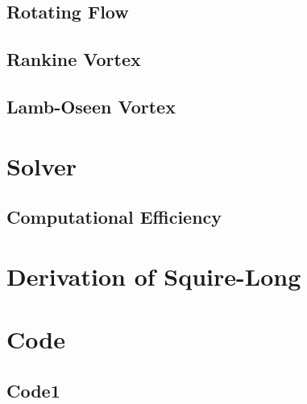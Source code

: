 \documentclass{X:/Documents/Coding/Latex/myreport}
\theoremstyle{plain}
\theoremstyle{definition}
\theoremstyle{remark}
\numberwithin{equation}{section}
\numberwithin{figure}{section}
\begin{document}
\section{Rotating Flow}
\section{Rankine Vortex}
\section{Lamb-Oseen Vortex}

\chapter{Solver}

\section{Computational Efficiency}


\begin{appendices}
\chapter{Derivation of Squire-Long}
\chapter{Code}
\section{Code1}
	
\end{appendices}


















\begin{thebibliography}{9}
%
%







\end{thebibliography}
\end{document}
